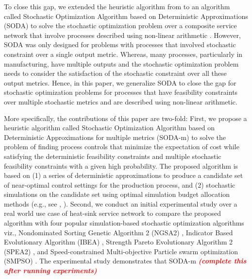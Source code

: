 \documentclass[a4paper, 12pt]{article} %
\newcommand\mycomment[1]{\textcolor{red}{\textbf{\textit{(#1)}}}}
\begin{document}
To close this gap, we extended the heuristic algorithm from \cite{Krishnamoorthy2015} to an algorithm called Stochastic Optimization Algorithm based on Deterministic Approximations (SODA) to solve the stochastic optimization problem over a composite service network that involve processes described using non-linear arithmetic \cite{GMU-CS-TR-2017-2}.
However, SODA was only designed for problems with processes that involved stochastic constraint over a single output metric. Whereas, many processes, particularly in manufacturing, have multiple outputs and the stochastic optimization problem needs to consider the satisfaction of the stochastic constraint over all these output metrics. 
Hence, in this paper, we generalize SODA to close the gap for stochastic optimization problems for processes that have feasibility constraints over multiple stochastic metrics and are described using non-linear arithmetic.

More specifically, the contributions of this paper are two-fold:
First, we propose a heuristic algorithm called Stochastic Optimization Algorithm based on Deterministic Approximations for multiple metrics (SODA-m) to solve the problem of finding process controls that minimize the expectation of cost while satisfying the deterministic feasibility constraints and multiple stochastic feasibility constraints with a given high probability. 
The proposed algorithm is based on (1) a series of deterministic approximations to produce a candidate set of near-optimal control settings for the production process, and (2) stochastic simulations on the candidate set using optimal simulation budget allocation methods (e.g., see \cite{Chen2011}, \cite{Lee2012OCBACO}).  
Second, we conduct an initial experimental study over a real world use case of heat-sink service network to compare the proposed algorithm with four popular simulation-based stochastic optimization algorithms viz., Nondominated Sorting Genetic Algorithm 2 (NGSA2) \cite{ngsa2}, Indicator Based Evolutionary Algorithm (IBEA) \cite{ibea}, Strength Pareto Evolutionary Algorithm 2 (SPEA2) \cite{spea2}, and Speed-constrained Multi-objective Particle swarm optimization (SMPSO) \cite{NDG09}.
The experimental study demonstrates that SODA-m \mycomment{complete this after running experiments}
\end{document}
